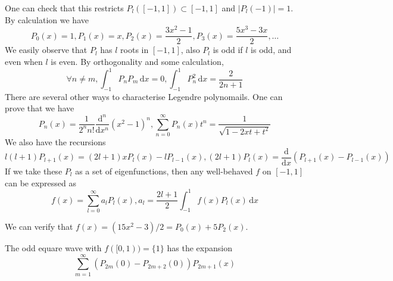 One can check that this restricts $P_l([-1,1])\subset [-1,1]$ and $|P_l(-1)|=1$.
By calculation we have
$$P_0(x)=1,P_1(x)=x,P_2(x)=\frac{3x^2-1}{2},P_3(x)=\frac{5x^3-3x}{2},\ldots$$
We easily observe that $P_l$ has $l$ roots in $[-1,1]$, also $P_l$ is odd if $l$ is odd, and even when $l$ is even.
By orthogonality and some calculation,
$$\forall n\neq m,\int_{-1}^1P_nP_m\,\mathrm dx=0,\int_{-1}^1P_n^2\,\mathrm dx=\frac{2}{2n+1}$$
There are several other ways to characterise Legendre polynomails.
One can prove that we have
$$P_n(x)=\frac{1}{2^nn!}\frac{\mathrm d^n}{\mathrm dx^n}(x^2-1)^n,\sum_{n=0}^\infty P_n(x)t^n=\frac{1}{\sqrt{1-2xt+t^2}}$$
We also have the recursions
$$l(l+1)P_{l+1}(x)=(2l+1)xP_l(x)-lP_{l-1}(x),(2l+1)P_l(x)=\frac{\mathrm d}{\mathrm dx}(P_{l+1}(x)-P_{l-1}(x))$$
If we take these $P_l$ as a set of eigenfunctions, then any well-behaved $f$ on $[-1,1]$ can be expressed as
$$f(x)=\sum_{l=0}^\infty a_lP_l(x),a_l=\frac{2l+1}{2}\int_{-1}^1f(x)P_l(x)\,\mathrm dx$$
\begin{example}
    We can verify that $f(x)=(15x^2-3)/2=P_0(x)+5P_2(x)$.
\end{example}
\begin{example}
    The odd equare wave with $f([0,1))=\{1\}$ has the expansion
    $$\sum_{m=1}^\infty (P_{2m}(0)-P_{2m+2}(0))P_{2m+1}(x)$$
\end{example}
